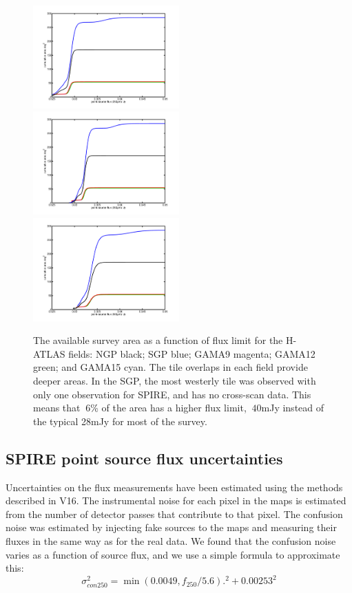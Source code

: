 \documentclass[useAMS,usenatbib]{mn2e}
\begin{document}
\begin{figure} %
\includegraphics[width=0.5\textwidth]{flux_area_250.pdf}
\includegraphics[width=0.5\textwidth]{flux_area_350.pdf}
\includegraphics[width=0.5\textwidth]{flux_area_500.pdf}
\caption{The available survey area as a function of flux limit for the
  H-ATLAS fields: NGP black; SGP blue; GAMA9 magenta; GAMA12 green;
  and GAMA15 cyan.  The tile overlaps in each field provide deeper
  areas.  In the SGP, the most westerly tile was observed with only
  one observation for SPIRE, and has no cross-scan data. This means
  that $~6$\% of the area has a higher flux limit, $~40$mJy instead of
  the typical 28mJy for most of the survey. }

\label{fig_areas}
\end{figure}

\subsection{SPIRE point source flux uncertainties} 
Uncertainties on the flux measurements have been estimated using the
methods described in V16. The instrumental noise for each pixel in the
maps is estimated from the number of detector passes that contribute
to that pixel. The confusion noise was estimated by injecting fake
sources to the maps and measuring their fluxes in the same way as for
the real data. We found that the confusion noise varies as a function
of source flux, and we use a simple formula to approximate this:
\begin{equation} 
\sigma_{con250}^2 = \min(0.0049,f_{250}/5.6).^2 + 0.00253^2
\end{equation}
\end{document}
